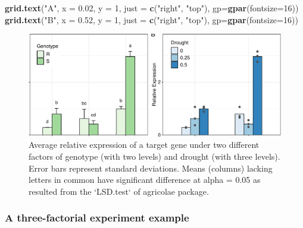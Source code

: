 \documentclass[
]{article}
\newenvironment{Shaded}{\begin{snugshade}}{\end{snugshade}}
\newcommand{\AttributeTok}[1]{\textcolor[rgb]{0.13,0.29,0.53}{#1}}
\newcommand{\DecValTok}[1]{\textcolor[rgb]{0.00,0.00,0.81}{#1}}
\newcommand{\FloatTok}[1]{\textcolor[rgb]{0.00,0.00,0.81}{#1}}
\newcommand{\FunctionTok}[1]{\textcolor[rgb]{0.13,0.29,0.53}{\textbf{#1}}}
\newcommand{\NormalTok}[1]{#1}
\newcommand{\StringTok}[1]{\textcolor[rgb]{0.31,0.60,0.02}{#1}}
\begin{document}
\begin{Shaded}
\begin{Highlighting}[]
\FunctionTok{grid.text}\NormalTok{(}\StringTok{"A"}\NormalTok{, }\AttributeTok{x =} \FloatTok{0.02}\NormalTok{, }\AttributeTok{y =} \DecValTok{1}\NormalTok{, }\AttributeTok{just =} \FunctionTok{c}\NormalTok{(}\StringTok{"right"}\NormalTok{, }\StringTok{"top"}\NormalTok{), }\AttributeTok{gp=}\FunctionTok{gpar}\NormalTok{(}\AttributeTok{fontsize=}\DecValTok{16}\NormalTok{))}
\FunctionTok{grid.text}\NormalTok{(}\StringTok{"B"}\NormalTok{, }\AttributeTok{x =} \FloatTok{0.52}\NormalTok{, }\AttributeTok{y =} \DecValTok{1}\NormalTok{, }\AttributeTok{just =} \FunctionTok{c}\NormalTok{(}\StringTok{"right"}\NormalTok{, }\StringTok{"top"}\NormalTok{), }\AttributeTok{gp=}\FunctionTok{gpar}\NormalTok{(}\AttributeTok{fontsize=}\DecValTok{16}\NormalTok{))}
\end{Highlighting}
\end{Shaded}

\begin{figure}

{\centering \includegraphics{vignette_files/figure-latex/unnamed-chunk-12-1} 

}

\caption{Average relative expression of a target gene under two different factors of genotype (with two levels) and drought (with three levels). Error bars represent standard deviations. Means (columns) lacking letters in common have significant difference at alpha = 0.05 as resulted from the `LSD.test` of agricolae package.}\label{fig:unnamed-chunk-12}
\end{figure}

\hypertarget{a-three-factorial-experiment-example}{%
\subsubsection{A three-factorial experiment
example}\label{a-three-factorial-experiment-example}}
\end{document}
